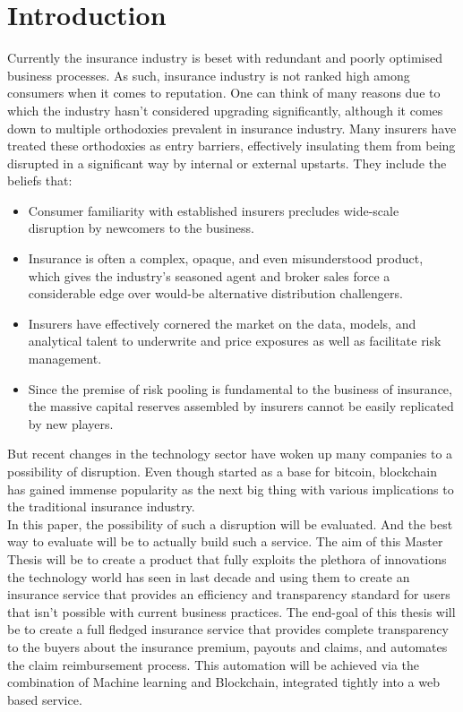 \chapter{Introduction}

Currently the insurance industry is beset with redundant and poorly optimised business processes. As such, insurance industry is not ranked high among consumers when it comes to reputation\cite{lauraMazzucaToops2014HarrisPropertyCasualty360}. One can think of many reasons due to which the industry hasn't considered upgrading significantly, although it comes down to multiple orthodoxies prevalent in insurance industry. Many insurers have treated these orthodoxies as entry barriers, effectively insulating them from being disrupted in a significant way by internal or external upstarts. They include the beliefs that\cite{Shaw2016InsurersDisrupted}:
\begin{itemize}
    \item Consumer familiarity with established insurers precludes wide-scale disruption by newcomers to the business.
    \item Insurance is often a complex, opaque, and even misunderstood product, which gives the industry's seasoned agent and broker sales force a considerable edge over would-be alternative distribution challengers.
    \item Insurers have effectively cornered the market on the data, models, and analytical talent to underwrite and price exposures as well as facilitate risk management.
    \item Since the premise of risk pooling is fundamental to the business of insurance, the massive capital reserves assembled by insurers cannot be easily replicated by new players.
\end{itemize}

But recent changes in the technology sector have woken up many companies to a possibility of disruption. Even though started as a base for bitcoin, blockchain has gained immense popularity as the next big thing with various implications to the traditional insurance industry.
\\ In this paper, the possibility of such a disruption will be evaluated. And the best way to evaluate will be to actually build such a service. The aim of this Master Thesis will be to create a product that fully exploits the plethora of innovations the technology world has seen in last decade and using them to create an insurance service that provides an efficiency and transparency standard for users that isn't possible with current business practices. The end-goal of this thesis will be to create a full fledged insurance service that provides complete transparency to the buyers about the insurance premium, payouts and claims, and automates the claim reimbursement process. This automation will be achieved via the combination of Machine learning and Blockchain, integrated tightly into a web based service.

